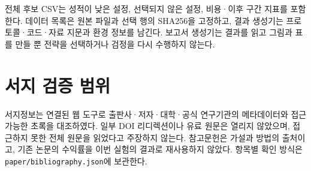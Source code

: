 \documentclass[11pt,a4paper]{article}
\begin{document}
전체 후보 CSV는 성적이 낮은 설정, 선택되지 않은 설정, 비용·이후 구간 지표를 포함한다. 데이터 목록은 원본 파일과 선택 행의 SHA256을 고정하고, 결과 생성기는 프로토콜·코드·자료 지문과 환경 정보를 남긴다. 보고서 생성기는 결과를 읽고 그림과 표를 만들 뿐 전략을 선택하거나 검정을 다시 수행하지 않는다.

\section{서지 검증 범위}
서지정보는 연결된 웹 도구로 출판사·저자·대학·공식 연구기관의 메타데이터와 접근 가능한 초록을 대조하였다. 일부 DOI 리디렉션이나 유료 원문은 열리지 않았으며, 접근하지 못한 전체 원문을 읽었다고 주장하지 않는다. 참고문헌은 가설과 방법의 출처이고, 기존 논문의 수익률을 이번 실험의 결과로 재사용하지 않았다. 항목별 확인 방식은 \texttt{paper/bibliography.json}에 보관한다.
\end{document}
